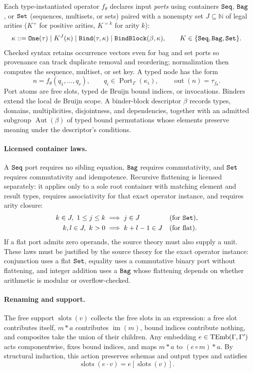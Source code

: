 Each type-instantiated operator $f_\theta$ declares input \emph{ports} using
containers $\texttt{Seq}$, $\texttt{Bag}$, or $\texttt{Set}$ (sequences, multisets, or sets) paired
with a nonempty set $J\subseteq\mathbb N$ of legal arities ($K^+$ for positive
arities, $K^{=k}$ for arity $k$):
\[
 \kappa ::= \texttt{One}(\tau)\mid K^J(\kappa)
 \mid\texttt{Bind}(\tau,\kappa)\mid\texttt{BindBlock}(\beta,\kappa),
 \qquad K\in\{\texttt{Seq},\texttt{Bag},\texttt{Set}\}.
\]
Checked syntax retains occurrence vectors even for bag and set ports so
provenance can track duplicate removal and reordering; normalization then
computes the sequence, multiset, or set key. A typed node has the form
\[
 n=f_\theta(q_1,\ldots,q_r),\qquad
 q_i\in\operatorname{Port}_\Gamma(\kappa_i),\qquad
 \operatorname{out}(n)=\tau_{f_\theta}.
\]
Port atoms are free slots, typed de Bruijn bound indices, or invocations.
Binders extend the local de Bruijn scope. A binder-block descriptor $\beta$
records types, domains, multiplicities, disjointness, and dependencies,
together with an admitted subgroup $\operatorname{Aut}(\beta)$ of typed bound
permutations whose elements preserve meaning under the descriptor's conditions.

\paragraph{Licensed container laws.}
A $\texttt{Seq}$ port requires no sibling equation, $\texttt{Bag}$ requires commutativity, and
$\texttt{Set}$ requires commutativity and idempotence. Recursive flattening is licensed
separately: it applies only to a sole root container with matching element and
result types, requires associativity for that exact operator instance, and
requires arity closure:
\begin{align*}
 k\in J,\ 1\le j\le k &\implies j\in J &&(\text{for }\texttt{Set}),\\
 k,l\in J,\ k>0 &\implies k+l-1\in J &&(\text{for flat}).
\end{align*}
If a flat port admits zero operands, the source theory must also supply a unit.
These laws must be justified by the source theory for the exact operator
instance: conjunction uses a flat $\texttt{Set}$, equality uses a commutative binary
port without flattening, and integer addition uses a $\texttt{Bag}$ whose flattening
depends on whether arithmetic is modular or overflow-checked.

\paragraph{Renaming and support.}
The free support $\operatorname{slots}(v)$ collects the free slots in an
expression: a free slot contributes itself, $m*a$ contributes $\operatorname{im}(m)$,
bound indices contribute nothing, and composites take the union of their
children. Any embedding $e\in\operatorname{TEmb}(\Gamma,\Gamma')$ acts componentwise, fixes
bound indices, and maps $m*a$ to $(e\circ m)*a$. By structural induction,
this action preserves schemas and output types and satisfies
\begin{equation}
 \operatorname{slots}(e\cdot v)=e[\operatorname{slots}(v)].
 \label{eq:support-action}
\end{equation}

